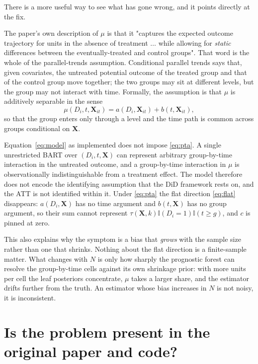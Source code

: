 \documentclass[11pt]{article}
\newcommand{\Xb}{\mathbf{X}}
\begin{document}
There is a more useful way to see what has gone wrong, and it points directly
at the fix.

The paper's own description of $\mu$ is that it "captures the expected outcome
trajectory for units in the absence of treatment $\ldots$ while allowing for
\emph{static} differences between the eventually-treated and control groups".
That word is the whole of the parallel-trends assumption. Conditional parallel
trends says that, given covariates, the untreated potential outcome of the
treated group and that of the control group move together; the two groups may
sit at different levels, but the group may not interact with time. Formally,
the assumption is that $\mu$ is additively separable in the sense
\begin{equation}\label{eq:pta}
  \mu(D_i, t, \Xb_{it}) = a(D_i, \Xb_{it}) + b(t, \Xb_{it}),
\end{equation}
so that the group enters only through a level and the time path is common
across groups conditional on $\Xb$.

Equation~\eqref{eq:model} as implemented does not impose \eqref{eq:pta}. A
single unrestricted BART over $(D_i, t, \Xb)$ can represent arbitrary
group-by-time interaction in the untreated outcome, and a group-by-time
interaction in $\mu$ is observationally indistinguishable from a treatment
effect. The model therefore does not encode the identifying assumption that the
DiD framework rests on, and the ATT is not identified within it. Under
\eqref{eq:pta} the flat direction \eqref{eq:flat} disappears: $a(D_i,\Xb)$ has
no time argument and $b(t,\Xb)$ has no group argument, so their sum cannot
represent $\tau(\Xb,k)\mathbb{I}(D_i=1)\mathbb{I}(t\geq g)$, and $c$ is pinned
at zero.

This also explains why the symptom is a bias that \emph{grows} with the sample
size rather than one that shrinks. Nothing about the flat direction is a
finite-sample matter. What changes with $N$ is only how sharply the prognostic
forest can resolve the group-by-time cells against its own shrinkage prior:
with more units per cell the leaf posteriors concentrate, $\mu$ takes a larger
share, and the estimator drifts further from the truth. An estimator whose bias
increases in $N$ is not noisy, it is inconsistent.

\section{Is the problem present in the original paper and code?}
\end{document}
